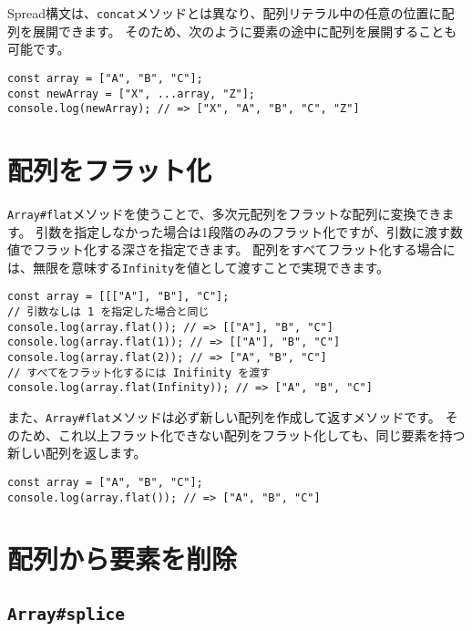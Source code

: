 Spread構文は、\texttt{concat}メソッドとは異なり、配列リテラル中の任意の位置に配列を展開できます。
そのため、次のように要素の途中に配列を展開することも可能です。

\begin{lstlisting}
const array = ["A", "B", "C"];
const newArray = ["X", ...array, "Z"];
console.log(newArray); // => ["X", "A", "B", "C", "Z"]
\end{lstlisting}

\hypertarget{flat}{%
\section[配列をフラット化]{配列をフラット化\protect{}}\label{flat}}

\texttt{Array\#flat}メソッド\protect{}を使うことで、多次元配列をフラットな配列に変換できます。
引数を指定しなかった場合は1段階のみのフラット化ですが、引数に渡す数値でフラット化する深さを指定できます。
配列をすべてフラット化する場合には、無限を意味する\texttt{Infinity}を値として渡すことで実現できます。

\begin{lstlisting}
const array = [[["A"], "B"], "C"];
// 引数なしは 1 を指定した場合と同じ
console.log(array.flat()); // => [["A"], "B", "C"]
console.log(array.flat(1)); // => [["A"], "B", "C"]
console.log(array.flat(2)); // => ["A", "B", "C"]
// すべてをフラット化するには Inifinity を渡す
console.log(array.flat(Infinity)); // => ["A", "B", "C"]
\end{lstlisting}

また、\texttt{Array\#flat}メソッドは必ず新しい配列を作成して返すメソッドです。
そのため、これ以上フラット化できない配列をフラット化しても、同じ要素を持つ新しい配列を返します。

\begin{lstlisting}
const array = ["A", "B", "C"];
console.log(array.flat()); // => ["A", "B", "C"]
\end{lstlisting}

\hypertarget{delete-element}{%
\section{配列から要素を削除}\label{delete-element}}

\hypertarget{splice}{%
\subsection{\texorpdfstring{\texttt{Array\#splice}}{Array\#splice}}\label{splice}}

